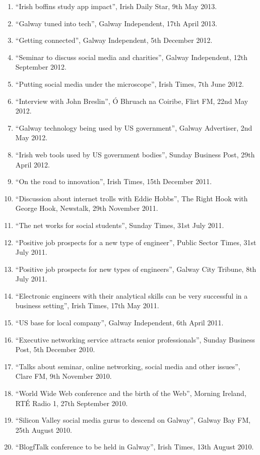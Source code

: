 \documentclass[10pt,a4paper]{res} %
\begin{document}
\begin{resume}
{\begin{enumerate}
\item ``Irish boffins study app impact'', Irish Daily Star, 9th May 2013.
\item ``Galway tuned into tech'', Galway Independent, 17th April 2013.
\item ``Getting connected'', Galway Independent, 5th December 2012.
\item ``Seminar to discuss social media and charities'', Galway Independent, 12th September 2012.
\item ``Putting social media under the microscope'', Irish Times, 7th June 2012.
\item ``Interview with John Breslin'', \'{O} Bhruach na Coiribe, Flirt FM, 22nd May 2012.
\item ``Galway technology being used by US government'', Galway Advertiser, 2nd May 2012.
\item ``Irish web tools used by US government bodies'', Sunday Business Post, 29th April 2012.
\item ``On the road to innovation'', Irish Times, 15th December 2011.
\item ``Discussion about internet trolls with Eddie Hobbs'', The Right Hook with George Hook, Newstalk, 29th November 2011.
\item ``The net works for social students'', Sunday Times, 31st July 2011.
\item ``Positive job prospects for a new type of engineer'', Public Sector Times, 31st July 2011.
\item ``Positive job prospects for new types of engineers'', Galway City Tribune, 8th July 2011.
\item ``Electronic engineers with their analytical skills can be very successful in a business setting'', Irish Times, 17th May 2011.
\item ``US base for local company'', Galway Independent, 6th April 2011.
\item ``Executive networking service attracts senior professionals'', Sunday Business Post, 5th December 2010.
\item ``Talks about seminar, online networking, social media and other issues'', Clare FM, 9th November 2010.
\item ``World Wide Web conference and the birth of the Web'', Morning Ireland, RT\'{E} Radio 1, 27th September 2010.
\item ``Silicon Valley social media gurus to descend on Galway'', Galway Bay FM, 25th August 2010.
\item ``BlogfTalk conference to be held in Galway'', Irish Times, 13th August 2010.

\end{enumerate}}
\end{resume}
\end{document}
